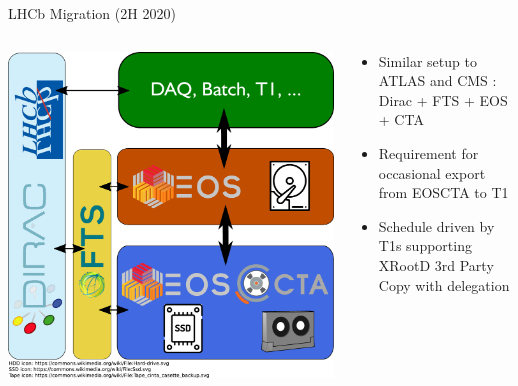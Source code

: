\documentclass[aspectratio=1610]{beamer}
\begin{document}
\begin{frame}{LHCb Migration (2H 2020)}
\begin{columns}
	\begin{column}{0.4\textwidth}
		\begin{center}
		  \includegraphics[width=\textwidth]{images/CTA_Deployment_LHCb.pdf}
		\end{center}
	\end{column}
	\begin{column}{0.55\textwidth}
		\begin{itemize}
		  \item Similar setup to ATLAS and CMS : Dirac + FTS + EOS + CTA
		  \item Requirement for occasional export from EOSCTA to T1
        \item Schedule driven by T1s supporting XRootD 3rd Party Copy with delegation
		\end{itemize}
	\end{column}
\end{columns}
\end{frame}
\end{document}
